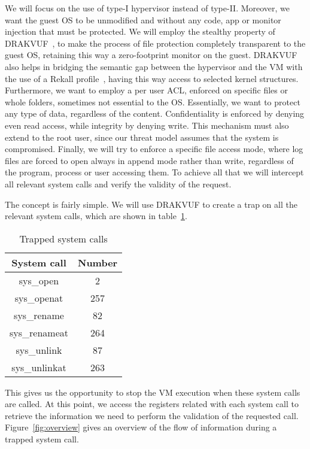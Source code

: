 \par We will focus on the use of type-I hypervisor instead of type-II. Moreover, we want the guest \ac{OS} to be unmodified and without any code, app or monitor injection that must be protected. We will employ the stealthy property of DRAKVUF~\cite{lengyel2014drakvuf}, to make the process of file protection completely transparent to the guest \ac{OS}, retaining this way a zero-footprint monitor on the guest. DRAKVUF also helps in bridging the semantic gap between the hypervisor and the \ac{VM} with the use of a Rekall profile~\cite{rekall}, having this way access to selected kernel structures. Furthermore, we want to employ a per user \ac{ACL}, enforced on specific files or whole folders, sometimes not essential to the \ac{OS}. Essentially, we want to protect any type of data, regardless of the content. Confidentiality is enforced by denying even read access, while integrity by denying write. This mechanism must also extend to the root user, since our threat model assumes that the system is compromised. Finally, we will try to enforce a specific file access mode, where log files are forced to open always in append mode rather than write, regardless of the program, process or user accessing them. To achieve all that we will intercept all relevant system calls and verify the validity of the request. 

\par The concept is fairly simple. We will use DRAKVUF to create a trap on all the relevant system calls, which are shown in table~\ref{tbl:syscalls}.

\begin{table}[h]
	\centering
	\caption{Trapped system calls}
	\label{tbl:syscalls}
	\begin{tabular}{cc}
		\toprule
		System call & Number \\
		\hline
		sys\_open & 2 \\ sys\_openat & 257 \\ sys\_rename & 82 \\ sys\_renameat & 264 \\ sys\_unlink & 87 \\ sys\_unlinkat & 263 \\
		\bottomrule
\end{tabular}	
\end{table}

This gives us the opportunity to stop the \ac{VM} execution when these system calls are called. At this point, we access the registers related with each system call to retrieve the information we need to perform the validation of the requested call. Figure~\ref{fig:overview} gives an overview of the flow of information during a trapped system call. 

